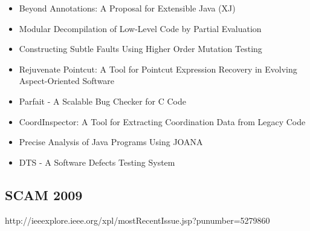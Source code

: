 {\begin{itemize}[itemsep=-1ex]
  \item Beyond Annotations: A Proposal for Extensible Java (XJ)
  \item Modular Decompilation of Low-Level Code by Partial Evaluation
  \item Constructing Subtle Faults Using Higher Order Mutation Testing
  \item Rejuvenate Pointcut: A Tool for Pointcut Expression Recovery in Evolving Aspect-Oriented Software
  \item Parfait - A Scalable Bug Checker for C Code
  \item CoordInspector: A Tool for Extracting Coordination Data from Legacy Code
  \item Precise Analysis of Java Programs Using JOANA
  \item DTS - A Software Defects Testing System
\end{itemize}
}

\subsection{SCAM 2009}

http://ieeexplore.ieee.org/xpl/mostRecentIssue.jsp?punumber=5279860

